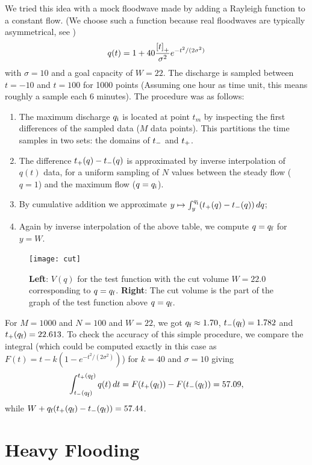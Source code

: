 We tried this idea with a mock floodwave made by adding a Rayleigh function to a constant flow.
(We choose such a function because real floodwaves are typically asymmetrical, see \cite{Lon})
\begin{equation}
q(t) = 1 + 40 \frac{\left[t\right]_{+}}{\sigma^2} e^{-t^2/(2\sigma^2)} 
\end{equation}
with $\sigma=10$ and a goal capacity of $W=22$.
The discharge is sampled between $t=-10$ and $t=100$ for 1000 points (Assuming one hour as time unit, this means roughly a sample each 6 minutes).
The procedure was as follows:
\begin{enumerate}
	\item The maximum discharge $q_{\mbox{\scriptsize i}}$ is located at point $t_m$ by inspecting the first differences of the sampled data ($M$ data points). This partitions the time samples in two sets: the domains of $t_{-}$ and $t_{+}$.
	\item The difference $t_{+}(q) - t_{-}(q)$ is approximated by inverse interpolation of $q(t)$ data, for a uniform sampling of $N$ values between the steady flow ($q=1$) and the maximum flow ($q=q_{\mbox{\scriptsize i}}$).
	\item By cumulative addition we approximate $y\mapsto \int_y^{q_{\mbox{\scriptsize i}}}(t_{+}(q) - t_{-}(q))\,dq$;
    \item Again by inverse interpolation of the above table, we compute $q=q_{\mbox{\scriptsize f}}$ for $y=W$.
\end{enumerate}
\begin{figure}
\begin{center}
\texttt{[image: cut]}\label{fig:cut}
\end{center}
\caption{\textbf{Left}: $V(q)$ for the test function with the cut volume $W=22.0$
corresponding to $q=q_{\mbox{\scriptsize f}}$.\textbf{ Right}: The cut volume is the part
of the graph of the test function above $q=q_{\mbox{\scriptsize f}}$. }
\end{figure}

For $M=1000$ and $N=100$ and $W=22$, we got $q_{\mbox{\scriptsize f}}\approx 1.70$,  $t_{-}(q_{\mbox{\scriptsize f}})=1.782$ and $t_{+}(q_{\mbox{\scriptsize f}})=22.613$. To check the accuracy of this simple procedure, we compare the integral (which could be computed exactly in this case as $F(t)=t-k(1-e^{-t^2/(2\sigma^2)})$) for $k=40$ and $\sigma=10$ giving
\begin{equation}
\int_{t_{-}(q_{\mbox{\scriptsize f}})}^{t_{+}(q_{\mbox{\scriptsize f}})}q(t)\,dt = F(t_{+}(q_{\mbox{\scriptsize f}})) - F(t_{-}(q_{\mbox{\scriptsize f}})) = 57.09,
\end{equation}
while $W + q_{\mbox{\scriptsize f}}(t_{+}(q_{\mbox{\scriptsize f}}) - t_{-}(q_{\mbox{\scriptsize f}})) = 57.44$.



\section{Heavy Flooding} %

